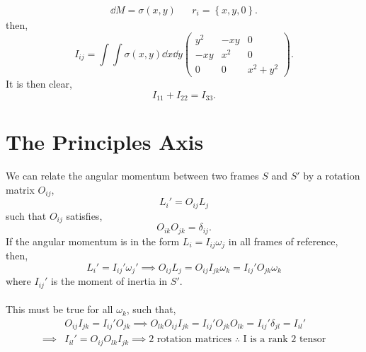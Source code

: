 \documentclass{book}
\begin{document}
\begin{align}
    \dd{M} = \sigma(x,y) && r_i = \left\{x,y,0\right\}.
\end{align}
then,
\begin{equation}
    I_{ij} = \int\int\sigma(x,y)\dd{x}\dd{y}\begin{pmatrix}
        y^2 & -xy & 0 \\
        -xy & x^2 & 0 \\
        0 & 0 & x^2 + y^2
    \end{pmatrix}.
\end{equation}
It is then clear,
\begin{equation}
    I_{11} + I_{22} = I_{33}.
\end{equation}

\section{The Principles Axis}
We can relate the angular momentum between two frames $S$ and $S'$ by a rotation matrix $O_{ij}$,
\begin{equation}
    L_i' = O_{ij}L_j
\end{equation}
such that $O_{ij}$ satisfies,
\begin{equation}
    O_{ik}O_{jk} = \delta_{ij}.
\end{equation}
If the angular momentum is in the form $L_i = I_{ij}\omega_j$ in all frames of reference, then,
\begin{equation}
    L_i' = I_{ij}'\omega_j' \implies O_{ij}L_j = O_{ij}I_{jk}\omega_k = I_{ij}'O_{jk}\omega_k
\end{equation}
where $I_{ij}'$ is the moment of inertia in $S'$.
\\\\
This must be true for all $\omega_k$, such that,
\begin{equation}
    \begin{split}
        &O_{ij}I_{jk} = I_{ij}'O_{jk} \implies O_{lk}O_{ij}I_{jk} = I_{ij}'O_{jk}O_{lk} = I_{ij}'\delta_{jl} = I_{il}'\\
        \implies&I_{il}' = O_{ij}O_{lk}I_{jk} \implies \text{2 rotation matrices $\therefore$ I is a rank 2 tensor}
    \end{split}
\end{equation}
\end{document}

